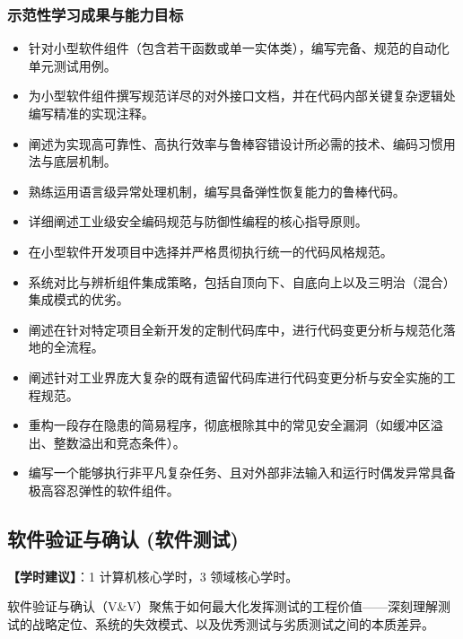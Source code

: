 \subsubsection{示范性学习成果与能力目标}
\begin{itemize}
    \item 针对小型软件组件（包含若干函数或单一实体类），编写完备、规范的自动化单元测试用例。
    \item 为小型软件组件撰写规范详尽的对外接口文档，并在代码内部关键复杂逻辑处编写精准的实现注释。
    \item 阐述为实现高可靠性、高执行效率与鲁棒容错设计所必需的技术、编码习惯用法与底层机制。
    \item 熟练运用语言级异常处理机制，编写具备弹性恢复能力的鲁棒代码。
    \item 详细阐述工业级安全编码规范与防御性编程的核心指导原则。
    \item 在小型软件开发项目中选择并严格贯彻执行统一的代码风格规范。
    \item 系统对比与辨析组件集成策略，包括自顶向下、自底向上以及三明治（混合）集成模式的优劣。
    \item 阐述在针对特定项目全新开发的定制代码库中，进行代码变更分析与规范化落地的全流程。
    \item 阐述针对工业界庞大复杂的既有遗留代码库进行代码变更分析与安全实施的工程规范。
    \item 重构一段存在隐患的简易程序，彻底根除其中的常见安全漏洞（如缓冲区溢出、整数溢出和竞态条件）。
    \item 编写一个能够执行非平凡复杂任务、且对外部非法输入和运行时偶发异常具备极高容忍弹性的软件组件。
\end{itemize}

\subsection{软件验证与确认 (软件测试)}
\textbf{【学时建议】}：1 计算机核心学时，3 领域核心学时。

软件验证与确认（V\&V）聚焦于如何最大化发挥测试的工程价值——深刻理解测试的战略定位、系统的失效模式、以及优秀测试与劣质测试之间的本质差异。

